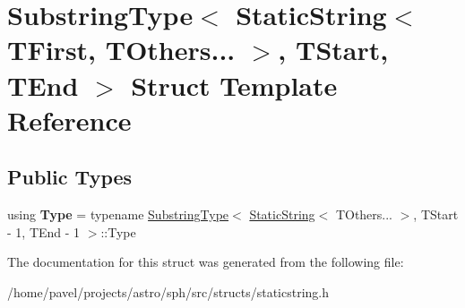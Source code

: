 \hypertarget{structSubstringType_3_01StaticString_3_01TFirst_00_01TOthers_8_8_8_01_4_00_01TStart_00_01TEnd_01_4}{}\section{Substring\+Type$<$ Static\+String$<$ T\+First, T\+Others... $>$, T\+Start, T\+End $>$ Struct Template Reference}
\label{structSubstringType_3_01StaticString_3_01TFirst_00_01TOthers_8_8_8_01_4_00_01TStart_00_01TEnd_01_4}
\subsection*{Public Types}
\begin{DoxyCompactItemize}
\item 
\hypertarget{structSubstringType_3_01StaticString_3_01TFirst_00_01TOthers_8_8_8_01_4_00_01TStart_00_01TEnd_01_4_aa80fb6fd8ec83b03d23cb36c43fe68ab}{}\label{structSubstringType_3_01StaticString_3_01TFirst_00_01TOthers_8_8_8_01_4_00_01TStart_00_01TEnd_01_4_aa80fb6fd8ec83b03d23cb36c43fe68ab} 
using {\bfseries Type} = typename \hyperlink{structSubstringType}{Substring\+Type}$<$ \hyperlink{structStaticString}{Static\+String}$<$ T\+Others... $>$, T\+Start -\/ 1, T\+End -\/ 1 $>$\+::Type
\end{DoxyCompactItemize}


The documentation for this struct was generated from the following file\+:\begin{DoxyCompactItemize}
\item 
/home/pavel/projects/astro/sph/src/structs/staticstring.\+h\end{DoxyCompactItemize}
